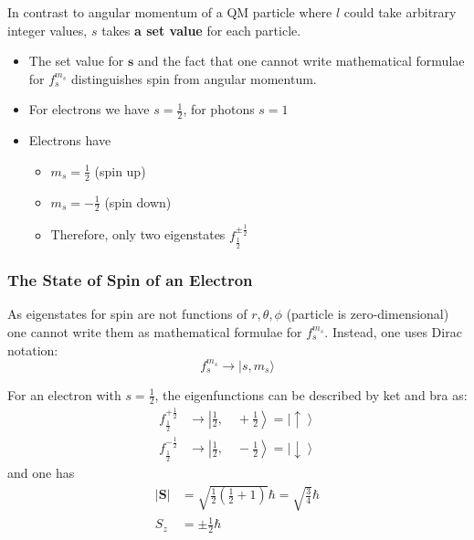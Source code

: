 
In contrast to angular momentum of a QM particle where $l$ could take arbitrary integer values, $s$ takes \textbf{a set value} for each particle.


\begin{itemize}
    \item The set value for $\mathbf{s}$ and the fact that one cannot write mathematical formulae for $f_{s}^{m_s}$ distinguishes spin from angular momentum.
    \item For electrons we have $s=\frac{1}{2}$, for photons $s=1$
    \item Electrons have
          \begin{itemize}
              \item $m_s=\frac{1}{2}$ (spin up)
              \item $m_s=-\frac{1}{2}$ (spin down)
              \item Therefore, only two eigenstates $f_{\frac{1}{2}}^{\pm \frac{1}{2}}$
          \end{itemize}
\end{itemize}

\subsubsection{The State of Spin of an Electron}
As eigenstates for spin are not functions of $r,\theta, \phi$ (particle is zero-dimensional) one cannot write them as mathematical formulae for $f_{s}^{m_s}$. Instead, one uses Dirac notation:
\begin{equation*}
    f_{s}^{m_{s}}\rightarrow|s,m_{s}\rangle
\end{equation*}


For an electron with $s=\frac{1}{2}$, the eigenfunctions can be described by ket and bra as:
\begin{align*}
    f_{\frac{1}{2}}^{+\frac{1}{2}} & \rightarrow\left|\frac{1}{2},\quad +\frac{1}{2}\right>= \left|\uparrow\right>   \\
    f_{\frac{1}{2}}^{-\frac{1}{2}} & \rightarrow\left|\frac{1}{2},\quad-\frac{1}{2}\right> = \left|\downarrow\right>
\end{align*}
and one has
\begin{align*}
    |\mathbf{S}| & =\sqrt{\frac{1}{2}\left(\frac{1}{2}+1\right)}\hbar=\sqrt{\frac{3}{4}}\hbar \\
    S_z          & =\pm \frac{1}{2}\hbar
\end{align*}

